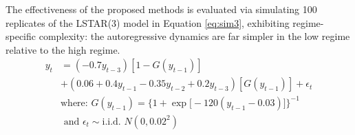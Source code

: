 The effectiveness of the proposed methods is evaluated via simulating 100 replicates of the LSTAR(3) model in Equation \ref{eq:sim3}, exhibiting regime-specific complexity: the autoregressive dynamics are far simpler in the low regime relative to the high regime.
 \begin{equation}
	\begin{split}
		\label{eq:sim3}
		y_t&=(-0.7y_{t-3})[1-G(y_{t-1})] \\
		& +(0.06+0.4y_{t-1}-0.35y_{t-2}+0.2y_{t-3})[G(y_{t-1})]+\epsilon_t\\
		& \textrm{where: } G(y_{t-1})=\bigg\{1+\exp\big[-120(y_{t-1}-0.03)\big]\bigg\}^{-1} \\
		&\textrm{ and }\epsilon_t \sim \textrm{i.i.d. }  N (0,0.02^2)\\
	\end{split}
\end{equation}

